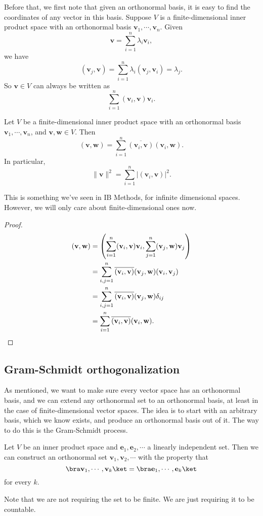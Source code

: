 \documentclass[a4paper]{article}
\begin{document}
Before that, we first note that given an orthonormal basis, it is easy to find the coordinates of any vector in this basis. Suppose $V$ is a finite-dimensional inner product space with an orthonormal basis $\mathbf{v}_1, \cdots, \mathbf{v}_n$. Given
\[
  \mathbf{v} = \sum_{i = 1}^n \lambda_i \mathbf{v}_i,
\]
we have
\[
  (\mathbf{v}_j, \mathbf{v}) = \sum_{i = 1}^n \lambda_i (\mathbf{v}_j, \mathbf{v}_i) = \lambda_j.
\]
So $\mathbf{v} \in V$ can always be written as
\[
  \sum_{i = 1}^n (\mathbf{v}_i, \mathbf{v}) \mathbf{v}_i.
\]
\begin{lemma}
  Let $V$ be a finite-dimensional inner product space with an orthonormal basis $\mathbf{v}_1, \cdots, \mathbf{v}_n$, and $\mathbf{v}, \mathbf{w} \in V$. Then
  \[
    (\mathbf{v}, \mathbf{w}) = \sum_{i = 1}^n \overline{(\mathbf{v}_i, \mathbf{v})} (\mathbf{v}_i, \mathbf{w}).
  \]
  In particular,
  \[
    \|\mathbf{v}\|^2 = \sum_{i = 1}^n |(\mathbf{v}_i, \mathbf{v})|^2.
  \]
\end{lemma}
This is something we've seen in IB Methods, for infinite dimensional spaces. However, we will only care about finite-dimensional ones now.

\begin{proof}
  \begin{align*}
    (\mathbf{v}, \mathbf{w}) &= \left(\sum_{i = 1}^n (\mathbf{v}_i, \mathbf{v}) \mathbf{v}_i, \sum_{j = 1}^n (\mathbf{v}_j, \mathbf{w}) \mathbf{v}_j\right)\\
    &= \sum_{i, j = 1}^n \overline{(\mathbf{v}_i, \mathbf{v})} (\mathbf{v}_j, \mathbf{w}) (\mathbf{v}_i, \mathbf{v}_j)\\
    &= \sum_{i, j = 1}^n \overline{(\mathbf{v}_i, \mathbf{v})} (\mathbf{v}_j, \mathbf{w}) \delta_{ij}\\
    &= \sum_{i = 1}^n \overline{(\mathbf{v}_i, \mathbf{v})} (\mathbf{v}_i, \mathbf{w}).\qedhere
  \end{align*}
\end{proof}

\subsection{Gram-Schmidt orthogonalization}
As mentioned, we want to make sure every vector space has an orthonormal basis, and we can extend any orthonormal set to an orthonormal basis, at least in the case of finite-dimensional vector spaces. The idea is to start with an arbitrary basis, which we know exists, and produce an orthonormal basis out of it. The way to do this is the Gram-Schmidt process.
\begin{thm}
  Let $V$ be an inner product space and $\mathbf{e}_1, \mathbf{e}_2, \cdots$ a linearly independent set. Then we can construct an orthonormal set $\mathbf{v}_1, \mathbf{v}_2, \cdots$ with the property that
  \[
    \bra \mathbf{v}_1, \cdots, \mathbf{v}_k\ket = \bra \mathbf{e}_1, \cdots, \mathbf{e}_k\ket
  \]
  for every $k$.
\end{thm}
Note that we are not requiring the set to be finite. We are just requiring it to be countable.
\end{document}
